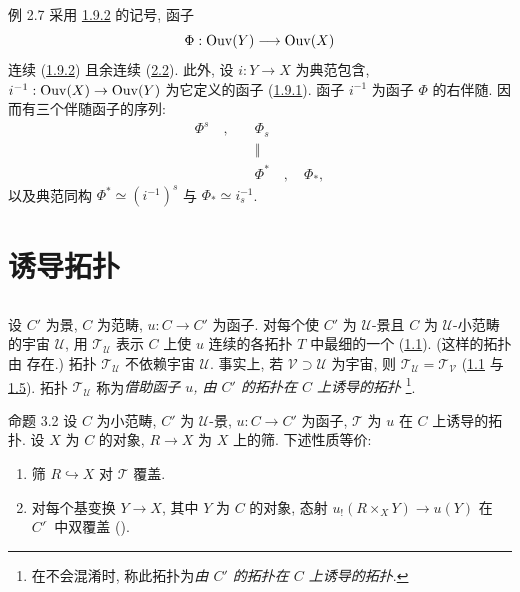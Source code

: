 \begin{enonce*}[remark]{例 2.7}
采用 \hyperref[III.exem1.9.2]{1.9.2} 的记号, 函子
$$
\Phi:\operatorname{Ouv}(Y)\longrightarrow \operatorname{Ouv}(X)
$$
连续 (\hyperref[III.exem1.9.2]{1.9.2}) 且余连续 (\hyperref[III.prop2.2]{2.2}).
此外, 设 $i:Y\rightarrow X$ 为典范包含,\pageoriginale{}
$i^{-1}:\operatorname{Ouv}(X)\rightarrow \operatorname{Ouv}(Y)$ 为它定义的函子
(\hyperref[III.exem1.9.1]{1.9.1}). 函子 $i^{-1}$ 为函子 $\Phi$ 的右伴随.
因而有三个伴随函子的序列:
\begin{align*}
\Phi^s\quad ,\quad & \Phi_s\\
        & ‖\\
        &\Phi^{\ast}\quad,\quad \Phi_{\ast},
\end{align*}
以及典范同构 $\Phi^{\ast}\simeq (i^{-1})^s$ 与 $\Phi_{\ast}\simeq i^{-1}_s$.
\end{enonce*}



\section{诱导拓扑}

\subsection{}
设 $C'$ 为景, $C$ 为范畴, $u:C\rightarrow C'$ 为函子.
对每个使 $C'$ 为 $𝒰$-景且 $C$ 为 $𝒰$-小范畴的宇宙 $𝒰$,
用 $𝒯_{𝒰}$ 表示 $C$ 上使 $u$ 连续的各拓扑 $T$ 中最细的一个
(\hyperref[III.def1.1]{1.1}). (这样的拓扑由  存在.)
拓扑 $𝒯_{𝒰}$ 不依赖宇宙 $𝒰$.
事实上, 若 $𝒱\supset 𝒰$ 为宇宙, 则 $𝒯_{𝒰}=𝒯_{𝒱}$
(\hyperref[III.def1.1]{1.1} 与 \hyperref[III.prop1.5]{1.5}).
拓扑 $𝒯_{𝒰}$ 称为\emph{借助函子 $u$, 由 $C'$ 的拓扑在 $C$ 上诱导的拓扑}
\footnote[1]{在不会混淆时, 称此拓扑为\emph{由 $C'$ 的拓扑在 $C$ 上诱导的拓扑}.}.

\begin{enonce*}{命题 3.2}
设 $C$ 为小范畴, $C'$ 为 $𝒰$-景, $u:C\rightarrow C'$ 为函子,
$𝒯$ 为 $u$ 在 $C$ 上诱导的拓扑.
设 $X$ 为 $C$ 的对象, $R\rightarrow X$ 为 $X$ 上的筛. 下述性质等价:
\begin{enumerate}
\renewcommand{\theenumi}{\roman{enumi}}
\renewcommand{\labelenumi}{\theenumi)}
\item 筛 $R\hookrightarrow X$ 对 $𝒯$ 覆盖.

\item 对每个基变换 $Y\rightarrow X$, 其中 $Y$ 为 $C$ 的对象,
态射 $u_{!}(R\times_X Y)\rightarrow u(Y)$ 在 ${C'}^{\widehat{\phantom{,}}}$ 中双覆盖
{\rm ().}
\end{enumerate}
\end{enonce*}

